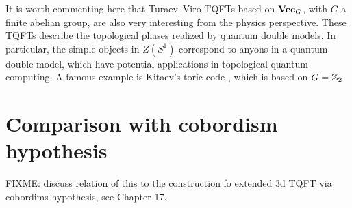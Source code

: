 It is worth commenting here that Turaev--Viro TQFTs based on $\mathbf{Vec}_G$, with $G$ a finite abelian group,
 are also very interesting from the physics perspective. These TQFTs describe the topological phases realized 
 by quantum double models. In particular, the simple objects in $Z(S^1)$ correspond to anyons in a 
 quantum double model, which have potential applications in topological quantum computing. A famous example
  is Kitaev's toric code , which is based on $G=\mathbb{Z}_2$.


\section{Comparison with cobordism hypothesis}
FIXME: discuss relation of this to the construction fo extended 3d TQFT via cobordims hypothesis, see Chapter 17. 